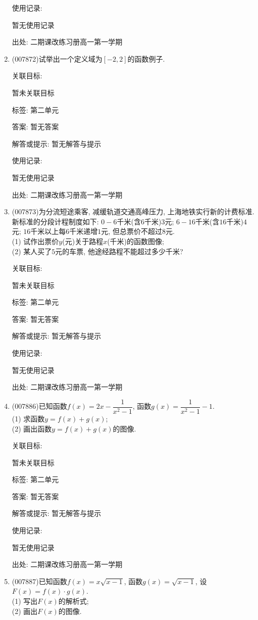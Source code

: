 \documentclass[10pt,a4paper]{article}
\begin{document}
\begin{enumerate}[1.]
使用记录:

暂无使用记录


出处: 二期课改练习册高一第一学期
\item { (007872)}试举出一个定义域为$[-2,2]$的函数例子.


关联目标:

暂未关联目标



标签: 第二单元

答案: 暂无答案

解答或提示: 暂无解答与提示

使用记录:

暂无使用记录


出处: 二期课改练习册高一第一学期
\item { (007873)}为分流短途乘客, 减缓轨道交通高峰压力, 上海地铁实行新的计费标准. 新标准的分段计程制度如下: $0-6$千米(含$6$千米)$3$元; $6-16$千米(含$16$千米)$4$元; $16$千米以上每$6$千米递增$1$元, 但总票价不超过$8$元.\\
(1) 试作出票价$y$(元)关于路程$x$(千米)的函数图像;\\
(2) 某人买了$5$元的车票, 他途经路程不能超过多少千米?


关联目标:

暂未关联目标



标签: 第二单元

答案: 暂无答案

解答或提示: 暂无解答与提示

使用记录:

暂无使用记录


出处: 二期课改练习册高一第一学期
\item { (007886)}已知函数$f(x)=2x-\dfrac 1{x^2-1}$, 函数$g(x)=\dfrac 1{x^2-1}-1$.\\
(1) 求函数$y=f(x)+g(x)$;\\
(2) 画出函数$y=f(x)+g(x)$的图像.


关联目标:

暂未关联目标



标签: 第二单元

答案: 暂无答案

解答或提示: 暂无解答与提示

使用记录:

暂无使用记录


出处: 二期课改练习册高一第一学期
\item { (007887)}已知函数$f(x)=x\sqrt {x-1}$, 函数$g(x)=\sqrt {x-1}$, 设$F(x)=f(x)\cdot g(x)$.\\
(1) 写出$F(x)$的解析式;\\
(2) 画出$F(x)$的图像.



\end{enumerate}
\end{document}
